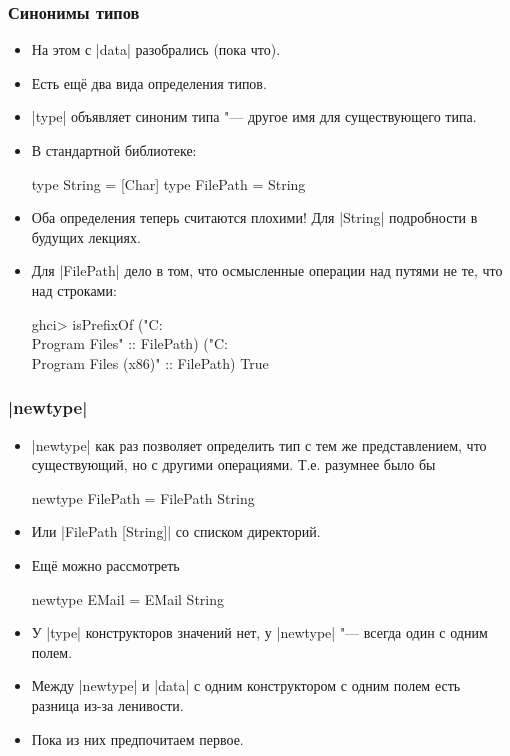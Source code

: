 \documentclass[10pt]{beamer}
\begin{document}
\begin{frame}[fragile]
  \frametitle{Синонимы типов}
  \begin{itemize}
    \item На этом с \haskinline|data| разобрались (пока что).
          \pause
    \item Есть ещё два вида определения типов.
    \item \haskinline|type| объявляет синоним типа "--- другое имя для существующего типа.
    \item В стандартной библиотеке:
          \begin{haskell}
            type String = [Char]
            type FilePath = String
          \end{haskell}
    \item Оба определения теперь считаются плохими! Для \haskinline|String| подробности в будущих лекциях.
          \pause
    \item Для \haskinline|FilePath| дело в том, что осмысленные операции над путями не те, что над строками:
          \begin{haskell}
            ghci> isPrefixOf 
                ("C:\\Program Files" :: FilePath) 
                ("C:\\Program Files (x86)" :: FilePath)
            True
          \end{haskell}
  \end{itemize}
\end{frame}

\begin{frame}[fragile]
  \frametitle{\haskinline|newtype|}
  \begin{itemize}
    \item \haskinline|newtype| как раз позволяет определить тип с тем же представлением, что существующий, но с другими операциями. Т.е. разумнее было бы
          \begin{haskell}
            newtype FilePath = FilePath String
          \end{haskell}
    \item Или \haskinline|FilePath [String]| со списком директорий.
    \item Ещё можно рассмотреть
          \begin{haskell}
            newtype EMail = EMail String
          \end{haskell}
    \item У \haskinline|type| конструкторов значений нет, у \haskinline|newtype| "--- всегда один с одним полем.
    \item Между \haskinline|newtype| и \haskinline|data| с одним конструктором с одним полем есть разница из-за ленивости.
    \item Пока из них предпочитаем первое.
  \end{itemize}
\end{frame}
\end{document}
